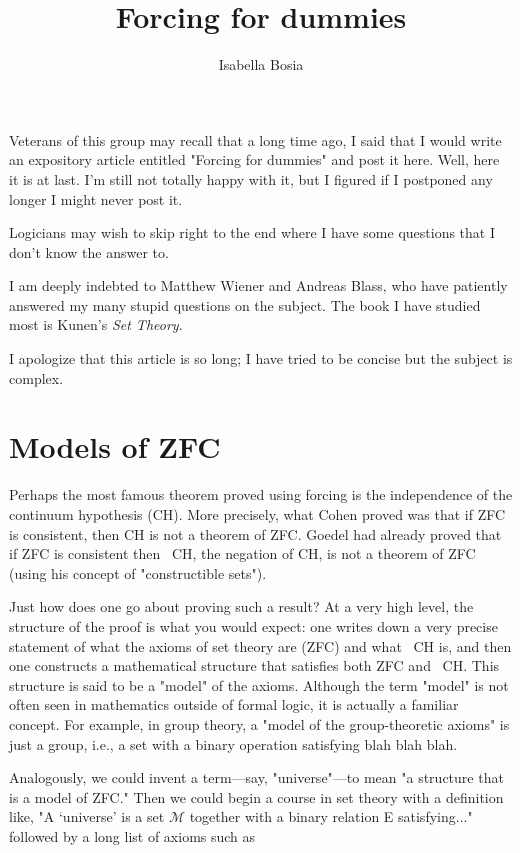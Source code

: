 \documentclass[10pt]{article}
\title{Forcing for dummies}
\author{Isabella Bosia}
\date{}
\theoremstyle{definition}
\begin{document}
\maketitle


Veterans of this group may recall that a long time ago, I said that I would
write an expository article entitled "Forcing for dummies" and post it here.
Well, here it is at last.  I'm still not totally happy with it, but I
figured if I postponed any longer I might never post it.

Logicians may wish to skip right to the end where I have some questions that
I don't know the answer to.

I am deeply indebted to Matthew Wiener and Andreas Blass, who have patiently
answered my many stupid questions on the subject.  The book I have studied
most is Kunen's \textit{Set Theory}.

I apologize that this article is so long; I have tried to be concise but the
subject is complex.


\section{Models of ZFC}

Perhaps the most famous theorem proved using forcing is the independence of
the continuum hypothesis (CH).  More precisely, what Cohen proved was that
if ZFC is consistent, then CH is not a theorem of ZFC.  Goedel had already
proved that if ZFC is consistent then ~CH, the negation of CH, is not a
theorem of ZFC (using his concept of "constructible sets").

Just how does one go about proving such a result?  At a very high level, the
structure of the proof is what you would expect: one writes down a very
precise statement of what the axioms of set theory are (ZFC) and what ~CH
is, and then one constructs a mathematical structure that satisfies both ZFC
and ~CH.  This structure is said to be a "model" of the axioms.  Although
the term "model" is not often seen in mathematics outside of formal logic,
it is actually a familiar concept.  For example, in group theory, a "model
of the group-theoretic axioms" is just a group, i.e., a set with a binary
operation satisfying blah blah blah.

Analogously, we could invent a term---say, "universe"---to mean "a structure
that is a model of ZFC."  Then we could begin a course in set theory with a
definition like, "A `universe' is a set $\mathcal{M}$ together with a binary relation E
satisfying..." followed by a long list of axioms such as
\end{document}
